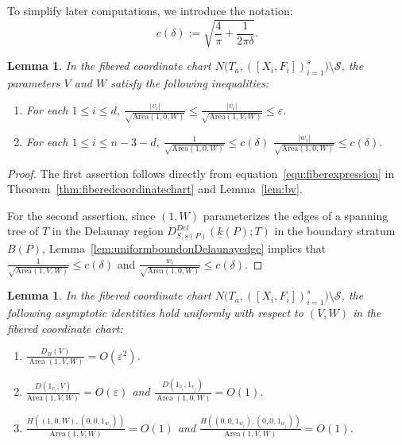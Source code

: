 \documentclass{compositio}
\numberwithin{equation}{section}
\numberwithin{figure}{section}
\theoremstyle{definition}
\theoremstyle{plain}
\newtheorem{lemma}[definition]{Lemma}
\begin{document}
{To simplify later computations, we introduce the notation:
\begin{equation}\label{equ:uniformboundonDelaunayedge}
    c(\delta) := \sqrt{\frac{4}{\pi} + \frac{1}{2\pi\delta}}.
\end{equation}

\begin{lemma}\label{lem:basicinequalityforVW}
In the fibered coordinate chart $N\big(T_a, ([X_i, F_i])_{i=1}^s\big) \setminus \mathcal{S}$, the parameters $V$ and $W$ satisfy the following inequalities:
    \begin{enumerate}
        \item For each $1 \leq i \leq d$,
        $
        \frac{|v_i|}{\sqrt{\mathrm{Area}(1,0,W)}} \leq\frac{|v_i|}{\sqrt{\mathrm{Area}(1,V,W)}}\leq \varepsilon.
        $
        
        \item For each $1 \leq i \leq n-3-d$,
        $
       \frac{1}{\sqrt{\mathrm{Area}(1,0,W)}} \leq c(\delta)$  $\frac{|w_i|}{\sqrt{\mathrm{Area}(1,0,W)}} \leq c(\delta).
        $
    \end{enumerate}
\end{lemma}

\begin{proof}
    The first assertion follows directly from equation~\eqref{equ:fiberexpression} in Theorem~\ref{thm:fiberedcoordinatechart} and Lemma~\ref{lem:bv}.

    For the second assertion, since $(1,W)$ parameterizes the edges of a spanning tree of $T$ in the Delaunay region $D_{S,\underline{s}(P)}^{Del}(\underline{k}(P);T)$ in the boundary stratum $B(P)$, Lemma~\ref{lem:uniformboundonDelaunayedge} implies that 
    $
    \frac{1}{\sqrt{\mathrm{Area}(1,V,W)}} \leq c(\delta)$ and $ \frac{w_i}{\sqrt{\mathrm{Area}(1,0,W)}} \leq c(\delta).
    $
\end{proof}


\begin{lemma}\label{lem:someidentitiesofuniformapproximation}
In the fibered coordinate chart $N\big(T_a, ([X_i, F_i])_{i=1}^s\big) \setminus \mathcal{S}$, the following asymptotic identities hold uniformly with respect to $(V,W)$ in the fibered coordinate chart:
\begin{enumerate}
    \item $\frac{D_B(V)}{\operatorname{Area}(1,V,W)}=O(\varepsilon^2)$.
    \item $\frac{D(1_{v_i}, V)}{\mathrm{Area}(1,V,W)} = O(\varepsilon)$ and $\frac{D(1_{v_i},1_{v_j})}{\operatorname{Area}(1,0,W)}=O(1)$.
    \item $\frac{H((1,0,W),(0,0,1_{w_j}))}{\mathrm{Area}(1,V,W)} = O(1)$ and $\frac{H((0,0,1_{w_i}),(0,0,1_{w_j}))}{\mathrm{Area}(1,V,W)} = O(1)$.
\end{enumerate}
\end{lemma}

}
\end{document}
